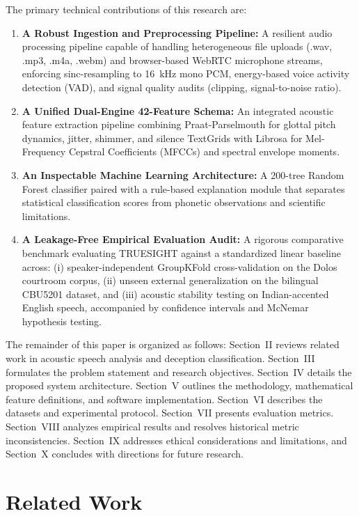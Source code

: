 \documentclass[conference]{IEEEtran}
\begin{document}
The primary technical contributions of this research are:
\begin{enumerate}
    \item \textbf{A Robust Ingestion and Preprocessing Pipeline:} A resilient audio processing pipeline capable of handling heterogeneous file uploads (.wav, .mp3, .m4a, .webm) and browser-based WebRTC microphone streams, enforcing sinc-resampling to 16~kHz mono PCM, energy-based voice activity detection (VAD), and signal quality audits (clipping, signal-to-noise ratio).
    \item \textbf{A Unified Dual-Engine 42-Feature Schema:} An integrated acoustic feature extraction pipeline combining Praat-Parselmouth for glottal pitch dynamics, jitter, shimmer, and silence TextGrids with Librosa for Mel-Frequency Cepstral Coefficients (MFCCs) and spectral envelope moments.
    \item \textbf{An Inspectable Machine Learning Architecture:} A 200-tree Random Forest classifier paired with a rule-based explanation module that separates statistical classification scores from phonetic observations and scientific limitations.
    \item \textbf{A Leakage-Free Empirical Evaluation Audit:} A rigorous comparative benchmark evaluating TRUESIGHT against a standardized linear baseline across: (i) speaker-independent GroupKFold cross-validation on the Dolos courtroom corpus, (ii) unseen external generalization on the bilingual CBU5201 dataset, and (iii) acoustic stability testing on Indian-accented English speech, accompanied by confidence intervals and McNemar hypothesis testing.
\end{enumerate}

The remainder of this paper is organized as follows: Section~II reviews related work in acoustic speech analysis and deception classification. Section~III formulates the problem statement and research objectives. Section~IV details the proposed system architecture. Section~V outlines the methodology, mathematical feature definitions, and software implementation. Section~VI describes the datasets and experimental protocol. Section~VII presents evaluation metrics. Section~VIII analyzes empirical results and resolves historical metric inconsistencies. Section~IX addresses ethical considerations and limitations, and Section~X concludes with directions for future research.

\section{Related Work}
\end{document}
